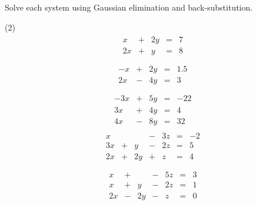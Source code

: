 \documentclass[12pt,fleqn]{book}
\newcommand{\prb}[1]{\begin{Exercise}#1\end{Exercise}}
\begin{document}
\clearpage
\prb{Solve each system using Gaussian elimination and back-substitution.
	\begin{tasks}(2)
		\task \vspace{-2.3em}
		\begin{align*}
			\begin{array}{rrrrr}
				x  & + & 2y & = & 7 \\
				2x & + & y  & = & 8 \\
			\end{array}
		\end{align*}
		\task \vspace{-2.3em}
		\begin{align*}
			\begin{array}{rrrrr}
				-x & + & 2y & = & 1.5 \\
				2x & - & 4y & = & 3   \\
			\end{array}
		\end{align*}
		\vspace{4in}
		\task \vspace{-2.3em}
		\begin{align*}
			\begin{array}{rrrrr}
				-3x & + & 5y & = & -22 \\
				3x  & + & 4y & = & 4   \\
				4x  & - & 8y & = & 32
			\end{array}
		\end{align*}
		\task \vspace{-2.3em}
		\begin{align*}
			\begin{array}{rrrrrrr}
				x  &   &    & - & 3z & = & -2 \\
				3x & + & y  & - & 2z & = & 5  \\
				2x & + & 2y & + & z  & = & 4  \\
			\end{array}
		\end{align*}
		\vspace{4in}
		\task \vspace{-2.3em}
		\begin{align*}
			\begin{array}{rrrrrrr}
				x  & + &    & - & 5z & = & 3 \\
				x  & + & y  & - & 2z & = & 1 \\
				2x & - & 2y & - & z  & = & 0
			\end{array}
		\end{align*}
		\vspace{5in}

\end{tasks}}
\end{document}

